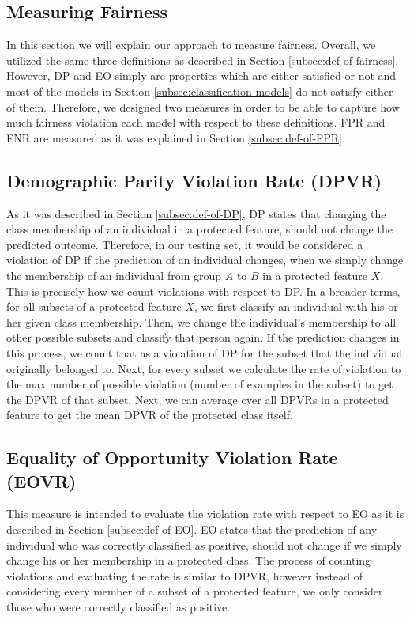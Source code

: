 \subsection{Measuring Fairness}
In this section we will explain our approach to measure fairness. Overall, we utilized the same three definitions as described in Section \ref{subsec:def-of-fairness}. However, DP and EO simply are properties which are either satisfied or not and most of the models in Section \ref{subsec:classification-models} do not satisfy either of them. Therefore, we designed two measures in order to be able to capture how much fairness violation each model with respect to these definitions. FPR and FNR are measured as it was explained in Section \ref{subsec:def-of-FPR}.

\subsection{Demographic Parity Violation Rate (DPVR)} \label{subsec:DPVR}
As it was described in Section \ref{subsec:def-of-DP}, DP states that changing the class membership of an individual in a protected feature, should not change the predicted outcome. Therefore, in our testing set, it would be considered a violation of DP if the prediction of an individual changes, when we simply change the membership of an individual from group $A$ to $B$ in a protected feature $X$. This is precisely how we count violations with respect to DP. In a broader terms, for all subsets of a protected feature $X$, we first classify an individual with his or her given class membership. Then, we change the individual's membership to all other possible subsets and classify that person again. If the prediction changes in this process, we count that as a violation of DP for the subset that the individual originally belonged to. Next, for every subset we calculate the rate of violation to the max number of possible violation (number of examples in the subset) to get the DPVR of that subset. Next, we can average over all DPVRs in a protected feature to get the mean DPVR of the protected class itself.

\subsection{Equality of Opportunity Violation Rate (EOVR)} \label{subsec:EOVR}
This measure is intended to evaluate the violation rate with respect to EO as it is described in Section \ref{subsec:def-of-EO}. EO states that the prediction of any individual who was correctly classified as positive, should not change if we simply change his or her membership in a protected class. The process of counting violations and evaluating the rate is similar to DPVR, however instead of considering every member of a subset of a protected feature, we only consider those who were correctly classified as positive.
